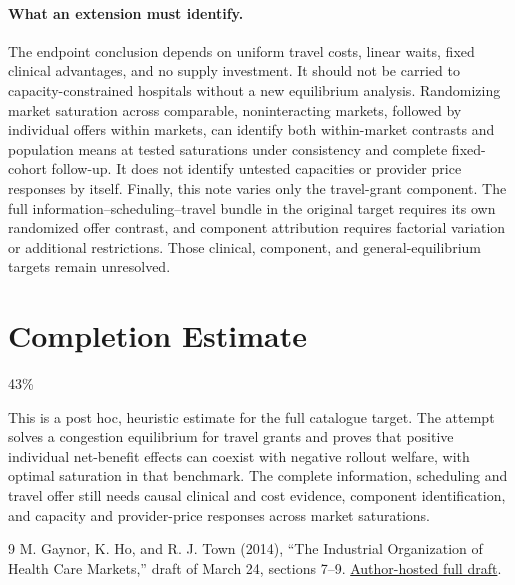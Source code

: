 \documentclass[11pt]{article}
\theoremstyle{definition}
\begin{document}
\paragraph{What an extension must identify.}
The endpoint conclusion depends on uniform travel costs, linear waits, fixed clinical advantages, and no supply investment. It should not be carried to capacity-constrained hospitals without a new equilibrium analysis. Randomizing market saturation across comparable, noninteracting markets, followed by individual offers within markets, can identify both within-market contrasts and population means at tested saturations under consistency and complete fixed-cohort follow-up. It does not identify untested capacities or provider price responses by itself. Finally, this note varies only the travel-grant component. The full information--scheduling--travel bundle in the original target requires its own randomized offer contrast, and component attribution requires factorial variation or additional restrictions. Those clinical, component, and general-equilibrium targets remain unresolved.

\section{Completion Estimate}
43\%

This is a post hoc, heuristic estimate for the full catalogue target.
The attempt solves a congestion equilibrium for travel grants and proves that positive individual net-benefit effects can coexist with negative rollout welfare, with optimal saturation in that benchmark. The complete information, scheduling and travel offer still needs causal clinical and cost evidence, component identification, and capacity and provider-price responses across market saturations.

\begin{thebibliography}{9}
 M. Gaynor, K. Ho, and R. J. Town (2014), ``The Industrial Organization of Health Care Markets,'' draft of March 24, sections 7--9. \href{https://kateho.scholar.princeton.edu/sites/g/files/toruqf4136/files/kateho/files/healthcare_io_3_24_14.pdf}{Author-hosted full draft}.
\end{thebibliography}
\end{document}
